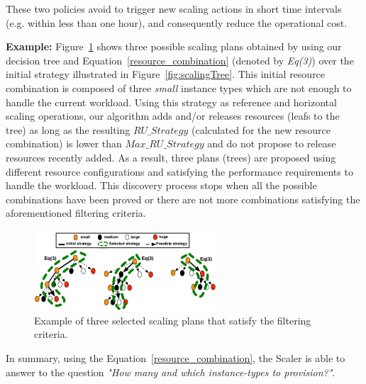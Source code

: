 These two policies avoid to trigger new scaling actions in short time intervals (e.g. within less than one hour), and consequently reduce the operational cost. 


\noindent\textbf{Example:} Figure~\ref{fig:scalingTreeSelection} shows three possible scaling plans obtained by using our decision tree and Equation~\ref{resource_combination} (denoted by \emph{Eq(3)}) over the initial strategy illustrated in Figure~\ref{fig:scalingTree}. This initial resource combination is composed of three \emph{small} instance types which are not enough to handle the current workload. Using this strategy as reference and horizontal scaling operations, our algorithm adds and/or releases resources (leafs to the tree) as long as the resulting \emph{$RU\_Strategy$} (calculated for the new resource combination) is lower than \emph{$Max\_RU\_Strategy$} and do not propose to release resources recently added. As a result, three plans (trees) are proposed using different resource configurations and satisfying the performance requirements to handle the workload. This discovery process stops when all the possible combinations have been proved or there are not more combinations satisfying the aforementioned filtering criteria. 



\begin{figure}[t]
  \begin{center}
    \includegraphics[width=0.7\linewidth,height=3cm]{images/optimalTree_selection}
  \end{center}
\vspace{-4mm}
  \caption{Example of three selected scaling plans that satisfy the filtering criteria.}
  \label{fig:scalingTreeSelection}
\end{figure}



In summary, using the Equation~\ref{resource_combination}, the Scaler is able to answer to the question \emph{"How many and which instance-types to provision?"}.


